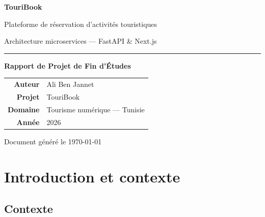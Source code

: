 \documentclass[11pt,a4paper]{report}
\begin{document}
\begin{titlepage}
\centering
\vspace*{1.5cm}


\vspace{0.8cm}
{\Huge\bfseries\color{tbDeep} TouriBook\par}
\vspace{0.4cm}
{\Large\color{tbBlue} Plateforme de réservation d'activités touristiques\par}
\vspace{0.3cm}
{\large\color{tbGrey} Architecture microservices — FastAPI \& Next.js\par}

\vspace{1.2cm}
\rule{0.55\textwidth}{1.2pt}
\vspace{1.2cm}

{\large\textbf{Rapport de Projet de Fin d'Études}\par}

\vfill

\begin{tabular}{@{}rl@{}}
\textbf{Auteur} & Ali Ben Jannet \\[4pt]
\textbf{Projet} & TouriBook \\[4pt]
\textbf{Domaine} & Tourisme numérique — Tunisie \\[4pt]
\textbf{Année} & 2026 \\
\end{tabular}

\vspace{1.5cm}
{\color{tbGrey}\small Document généré le \today\par}
\end{titlepage}

\tableofcontents
\thispagestyle{empty}
\clearpage

\chapter{Introduction et contexte}

\section{Contexte}
\end{document}
